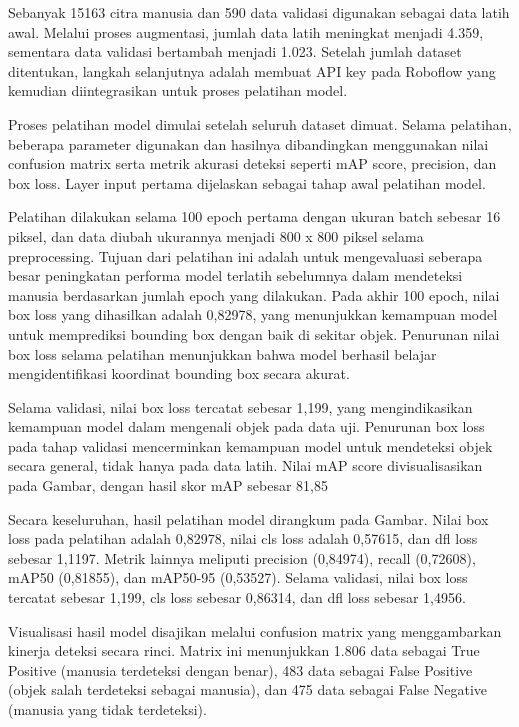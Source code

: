 Sebanyak 15163 citra manusia dan 590 data validasi digunakan sebagai data latih awal. Melalui proses augmentasi, jumlah data latih meningkat menjadi 4.359, sementara data validasi bertambah menjadi 1.023. Setelah jumlah dataset ditentukan, langkah selanjutnya adalah membuat API key pada Roboflow yang kemudian diintegrasikan untuk proses pelatihan model.

Proses pelatihan model dimulai setelah seluruh dataset dimuat. Selama pelatihan, beberapa parameter digunakan dan hasilnya dibandingkan menggunakan nilai confusion matrix serta metrik akurasi deteksi seperti mAP score, precision, dan box loss. Layer input pertama dijelaskan sebagai tahap awal pelatihan model.

Pelatihan dilakukan selama 100 epoch pertama dengan ukuran batch sebesar 16 piksel, dan data diubah ukurannya menjadi 800 x 800 piksel selama preprocessing. Tujuan dari pelatihan ini adalah untuk mengevaluasi seberapa besar peningkatan performa model terlatih sebelumnya dalam mendeteksi manusia berdasarkan jumlah epoch yang dilakukan. Pada akhir 100 epoch, nilai box loss yang dihasilkan adalah 0,82978, yang menunjukkan kemampuan model untuk memprediksi bounding box dengan baik di sekitar objek. Penurunan nilai box loss selama pelatihan menunjukkan bahwa model berhasil belajar mengidentifikasi koordinat bounding box secara akurat.

Selama validasi, nilai box loss tercatat sebesar 1,199, yang mengindikasikan kemampuan model dalam mengenali objek pada data uji. Penurunan box loss pada tahap validasi mencerminkan kemampuan model untuk mendeteksi objek secara general, tidak hanya pada data latih. Nilai mAP score divisualisasikan pada Gambar, dengan hasil skor mAP sebesar 81,85%

Secara keseluruhan, hasil pelatihan model dirangkum pada Gambar. Nilai box loss pada pelatihan adalah 0,82978, nilai cls loss adalah 0,57615, dan dfl loss sebesar 1,1197. Metrik lainnya meliputi precision (0,84974), recall (0,72608), mAP50 (0,81855), dan mAP50-95 (0,53527). Selama validasi, nilai box loss tercatat sebesar 1,199, cls loss sebesar 0,86314, dan dfl loss sebesar 1,4956.

Visualisasi hasil model disajikan melalui confusion matrix yang menggambarkan kinerja deteksi secara rinci. Matrix ini menunjukkan 1.806 data sebagai True Positive (manusia terdeteksi dengan benar), 483 data sebagai False Positive (objek salah terdeteksi sebagai manusia), dan 475 data sebagai False Negative (manusia yang tidak terdeteksi).

